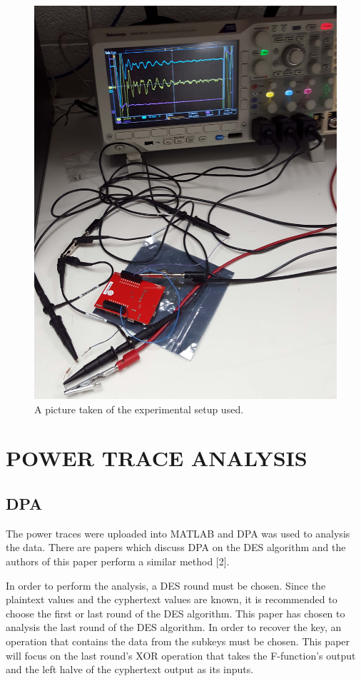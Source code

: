 \documentclass[letterpaper, 10 pt, conference]{ieeeconf}  %
\begin{document}
\begin{figure}[thpb]
	\centering
	\includegraphics[scale=.1]{setup}
    \caption{A picture taken of the experimental setup used.}
\end{figure} 

\section{POWER TRACE ANALYSIS}

\subsection{DPA}

The power traces were uploaded into MATLAB and DPA was used to analysis the data.  There are papers which discuss DPA on the DES algorithm and the authors of this paper perform a similar method [2].

In order to perform the analysis, a DES round must be chosen.  Since the plaintext values and the cyphertext values are known, it is recommended to choose the first or last round of the DES algorithm.  This paper has chosen to analysis the last round of the DES algorithm.  In order to recover the key, an operation that contains the data from the subkeys must be chosen.  This paper will focus on the last round's XOR operation that takes the F-function's output and the left halve of the cyphertext output as its inputs.
\end{document}
